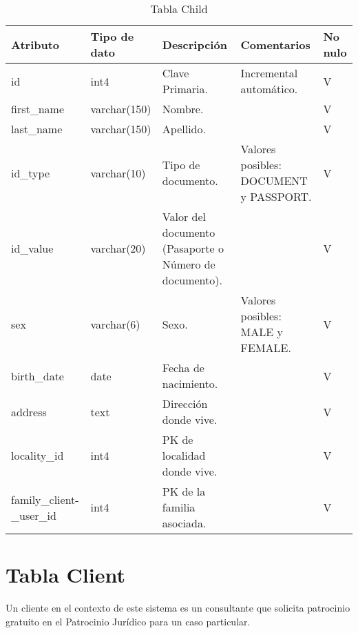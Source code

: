 \begin{table}[htbp]
\centering
\label{tab:child}

\begin{tabular}{|p{3cm}|p{2.5cm}|p{4.5cm}|p{4cm}|p{1cm}|}
\hline
\textbf{Atributo} & \textbf{Tipo de dato}  & \textbf{Descripción} & \textbf{Comentarios} & \textbf{No nulo} \\ \hline
id & int4 & Clave Primaria. & Incremental automático. & V \\ \hline
first\_name & varchar(150) & Nombre. &  & V \\ \hline
last\_name & varchar(150) & Apellido. &  & V \\ \hline
id\_type & varchar(10) & Tipo de documento. & Valores posibles: DOCUMENT y PASSPORT. & V \\ \hline
id\_value & varchar(20) & Valor del documento (Pasaporte o Número de documento). & & V \\ \hline
sex & varchar(6) & Sexo. & Valores posibles: MALE y FEMALE. & V \\ \hline
birth\_date & date & Fecha de nacimiento. & & V \\ \hline
address & text & Dirección donde vive. & & V \\ \hline
locality\_id & int4 & PK de localidad donde vive. & & V \\ \hline
family\_client- \_user\_id & int4 & PK de la familia asociada. & & V \\ \hline
\end{tabular}
\caption{Tabla Child}
\end{table}




\section{Tabla Client}\label{sec:table-client}
Un cliente en el contexto de este sistema es un consultante que solicita patrocinio gratuito en el Patrocinio Jurídico para un caso particular.

